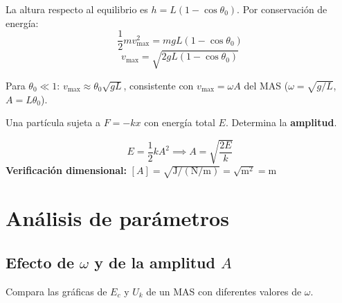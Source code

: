 \documentclass[12pt, a4paper, oneside]{book}
\begin{document}
\begin{solucion}
La altura respecto al equilibrio es $h = L(1-\cos\theta_{0})$.
Por conservaci\'on de energ\'ia:
\[
  \dfrac{1}{2}mv_{\max}^{2} = mgL(1-\cos\theta_{0})
\]
\[
  \boxed{v_{\max} = \sqrt{2gL(1-\cos\theta_{0})}}
\]

\begin{nota}
Para $\theta_{0}\ll 1$: $v_{\max} \approx \theta_{0}\sqrt{gL}$, consistente
con $v_{\max} = \omega A$ del MAS ($\omega = \sqrt{g/L}$, $A = L\theta_{0}$).
\end{nota}
\end{solucion}

\begin{problema}[title={Problema~15 --- Bauer}]
Una part\'icula sujeta a $F=-kx$ con energ\'ia total $E$.
Determina la \textbf{amplitud}.
\end{problema}

\begin{solucion}
\[
  E = \dfrac{1}{2}kA^{2}
  \implies
  \boxed{A = \sqrt{\dfrac{2E}{k}}}
\]
\textbf{Verificaci\'on dimensional:}
$[A] = \sqrt{\text{J}/(\text{N/m})} = \sqrt{\text{m}^{2}} = \text{m}$ \checkmark
\end{solucion}

\chapter{An\'alisis de par\'ametros}

\section{Efecto de $\omega$ y de la amplitud $A$}

\begin{problema}[title={Problema~16}]
Compara las gr\'aficas de $E_c$ y $U_k$ de un MAS con diferentes valores de $\omega$.
\end{problema}
\end{document}

